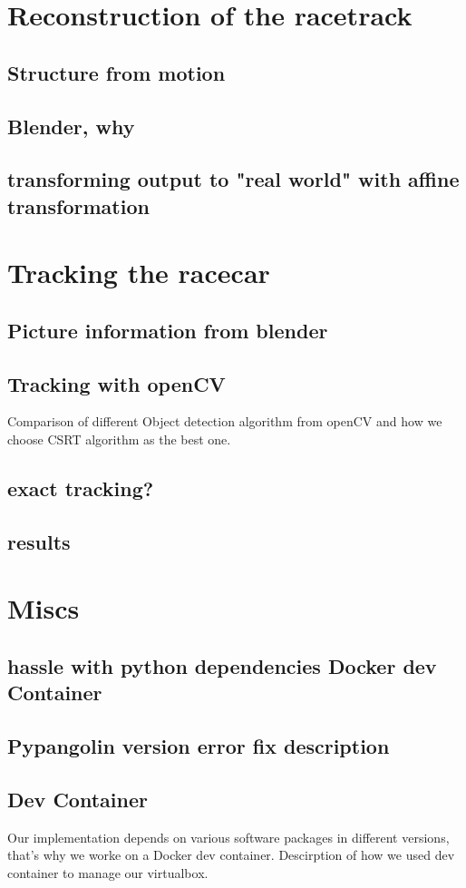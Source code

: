 \documentclass{article}
\begin{document}
\section{Reconstruction of the racetrack}

\subsection{Structure from motion}
\subsection{Blender, why}
\subsection{ transforming output to "real world" with affine transformation}


\newpage

\section{Tracking the racecar}

\subsection{ Picture information from blender}
\subsection{Tracking with openCV}

Comparison of different Object detection algorithm from openCV and how we choose CSRT algorithm as the best one.
\subsection{exact tracking? }
\subsection{results}





\section{Miscs}

\subsection{hassle with python dependencies
Docker dev Container}
\subsection{Pypangolin version error fix description}

\subsection{Dev Container}
Our implementation depends on various software packages in different versions, that's why we worke on a Docker dev container. Descirption of how we used dev container to manage our virtualbox.
\end{document}
